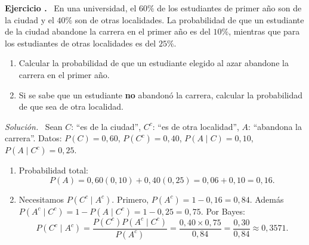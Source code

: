 \documentclass[11pt,a4paper]{article}
\newcounter{ejnum}
\newenvironment{ejercicio}{\refstepcounter{ejnum}\par\medskip\noindent\textbf{Ejercicio \theejnum.}~}{\par}
\newenvironment{solucion}{\par\noindent\textit{Solución.}~}{\par\vspace{1em}}
\begin{document}
\begin{ejercicio}
En una universidad, el $60\%$ de los estudiantes de primer año son de la ciudad y el $40\%$ son de otras localidades. La probabilidad de que un estudiante de la ciudad abandone la carrera en el primer año es del $10\%$, mientras que para los estudiantes de otras localidades es del $25\%$.
\begin{enumerate}[label=(\alph*)]
\item Calcular la probabilidad de que un estudiante elegido al azar abandone la carrera en el primer año.
\item Si se sabe que un estudiante \textbf{no} abandonó la carrera, calcular la probabilidad de que sea de otra localidad.
\end{enumerate}
\end{ejercicio}
\begin{solucion}
Sean $C$: ``es de la ciudad'', $C^c$: ``es de otra localidad'', $A$: ``abandona la carrera''. Datos: $P(C)=0{,}60$, $P(C^c)=0{,}40$, $P(A\mid C)=0{,}10$, $P(A\mid C^c)=0{,}25$.
\begin{enumerate}[label=(\alph*)]
\item Probabilidad total:
\[
P(A) = 0{,}60(0{,}10)+0{,}40(0{,}25) = 0{,}06+0{,}10=0{,}16.
\]
\item Necesitamos $P(C^c\mid A^c)$. Primero, $P(A^c)=1-0{,}16=0{,}84$. Además $P(A^c\mid C^c)=1-P(A\mid C^c)=1-0{,}25=0{,}75$. Por Bayes:
\[
P(C^c\mid A^c) = \frac{P(C^c)P(A^c\mid C^c)}{P(A^c)} = \frac{0{,}40\times 0{,}75}{0{,}84} = \frac{0{,}30}{0{,}84}\approx 0{,}3571.
\]
\end{enumerate}
\end{solucion}
\end{document}
